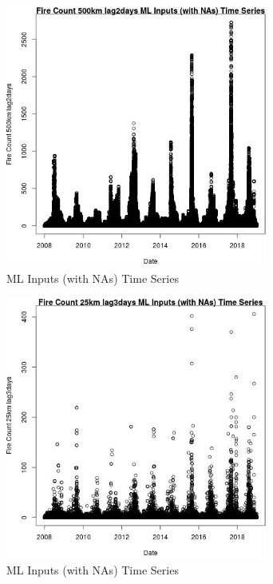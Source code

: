 \begin{figure} 
\centering  
\includegraphics[width=0.77\textwidth]{Code_Outputs/Report_ML_input_PM25_Step4_part_f_de_duplicated_aves_prioritize_24hr_obswNAs_Fire_Count_500km_lag2daysvDate.jpg} 
\caption{\label{fig:Report_ML_input_PM25_Step4_part_f_de_duplicated_aves_prioritize_24hr_obswNAsFire_Count_500km_lag2daysvDate}ML Inputs (with NAs) Time Series} 
\end{figure} 
 

\clearpage 

\begin{figure} 
\centering  
\includegraphics[width=0.77\textwidth]{Code_Outputs/Report_ML_input_PM25_Step4_part_f_de_duplicated_aves_prioritize_24hr_obswNAs_Fire_Count_25km_lag3daysvDate.jpg} 
\caption{\label{fig:Report_ML_input_PM25_Step4_part_f_de_duplicated_aves_prioritize_24hr_obswNAsFire_Count_25km_lag3daysvDate}ML Inputs (with NAs) Time Series} 
\end{figure} 
 

